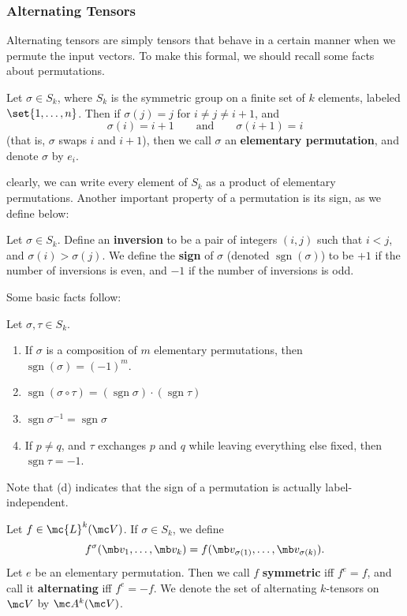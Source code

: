 \documentclass{fkbook}
\theoremstyle{snazzydefinition}
\DeclareMathOperator{\sgn}{sgn}
\begin{document}
\subsubsection{Alternating Tensors}
  Alternating tensors are simply tensors that behave in a certain
  manner when we permute the input vectors. To make this formal, we
  should recall some facts about permutations.
  \begin{definition}
    Let $\sigma \in S_k$, where $S_k$ is the symmetric group on a
    finite set of $k$ elements, labeled $\set{1, \ldots, n}$. Then if
    $\sigma(j) = j$ for $i \neq j \neq i+1$, and
    \[
      \sigma(i)= i+1 \qquad \text{and} \qquad \sigma(i+1) = i
    \]
    (that is, $\sigma$ swaps $i$ and $i+1$), then we call $\sigma$ an
    \textbf{elementary permutation}, and denote $\sigma$ by $e_i$.
  \end{definition}
  clearly, we can write every element of $S_k$ as a product of
  elementary permutations. Another important property of a permutation
  is its sign, as we define below:
  \begin{definition}
    Let $\sigma \in S_k$. Define an \textbf{inversion} to be a pair of
    integers $(i,j)$ such that $i<j$, and $\sigma(i) > \sigma(j)$. We
    define the \textbf{sign} of $\sigma$ (denoted $\sgn(\sigma)$) to
    be $+1$ if the number of inversions is even, and $-1$ if the
    number of inversions is odd.
  \end{definition}
  Some basic facts follow:
  \begin{lemma}
    Let $\sigma, \tau \in S_k$.
    \begin{enumerate}
      \item If $\sigma$ is a composition of $m$ elementary
        permutations, then $\sgn(\sigma) = (-1)^m$.
      \item $\sgn(\sigma \circ \tau) = (\sgn \sigma) \cdot (\sgn
        \tau)$
      \item $\sgn \sigma^{-1} = \sgn \sigma$
      \item If $p \neq q$, and $\tau$ exchanges $p$ and $q$ while
        leaving everything else fixed, then $\sgn \tau = -1$.
    \end{enumerate}
  \end{lemma}
  Note that (d) indicates that the sign of a permutation is actually
  label-independent.
  \begin{definition}
    Let $f \in \mc{L}^k(\mc V)$. If $\sigma \in S_k$, we define
    \[
      f^\sigma(\mb v_1, \ldots, \mb v_k) = f(\mb v_{\sigma(1)},
      \ldots, \mb v_{\sigma(k)}).
    \]
    Let $e$ be an elementary permutation. Then we call $f$
    \textbf{symmetric} iff $f^e = f$, and call it \textbf{alternating}
    iff $f^e = -f$. We denote the set of alternating $k$-tensors on
    $\mc V$ by $\mc A^k(\mc V)$.
  \end{definition}
\end{document}
